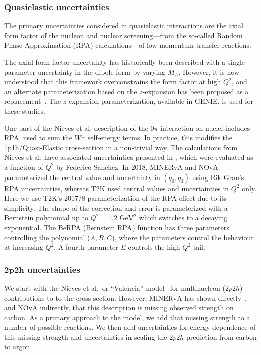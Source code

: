 \subsubsection{Quasielastic uncertainties}
The primary uncertainties considered in quasielastic interactions are the axial form factor of the nucleon and nuclear screening---from the so-called Random Phase Approximation (RPA) calculations---of low momentum transfer reactions.

The axial form factor uncertainty has historically been described with a single parameter uncertainty in the dipole form by varying $M_A$.  However, it is now understood that this framework overconstrains the form factor at high $Q^2$, and an alternate parameterization based on the $z$-expansion has been proposed as a replacement~\cite{Meyer:2016oeg}. The $z$-expansion parameterization, available in GENIE, is used for these studies.

One part of the Nieves et al.\cite{nieves1,nieves2} description of the $0\pi$ interaction on nuclei includes RPA, used to sum the $W^\pm$ self-energy terms. In practice, this modifies the 1p1h/Quasi-Elastic cross-section in a non-trivial way. The calculations from Nieves et al. have associated uncertainties presented in \cite{nieves_uncert}, which were evaluated as a function of $Q^2$ by Federico Sanchez. In 2018, MINERvA and NOvA parameterized the central value and uncertainty in $(q_0, q_3)$ using Rik Gran's RPA uncertainties\cite{RikRPA}, whereas T2K used central values and uncertainties in $Q^2$ only. Here we use T2K's 2017/8 parameterization of the RPA effect\cite{t2k_2018} due to its simplicity. The shape of the correction and error is parameterized with a Bernstein polynomial up to $Q^2=1.2\text{ GeV}^2$ which switches to a decaying exponential. The BeRPA (Bernstein RPA) function has three parameters controlling the polynomial ($A, B, C$), where the parameters control the behaviour at increasing $Q^2$. A fourth parameter $E$ controls the high $Q^2$ tail. 

\subsubsection{$\boldsymbol{2p2h}$ uncertainties}
We start with the Nieves et al.\ or ``Valencia'' model~\cite{nieves1,nieves2} for multinucleon ($2p2h$) contributions to to the cross section.  However, MINERvA has shown directly~\cite{Rodrigues:2015hik}, and NOvA indirectly, that this description is missing observed strength on carbon.  As a primary approach to the model, we add that missing strength to a number of possible reactions.  We then add uncertainties for energy dependence of this missing strength and uncertainties in scaling the $2p2h$ prediction from carbon to argon.

